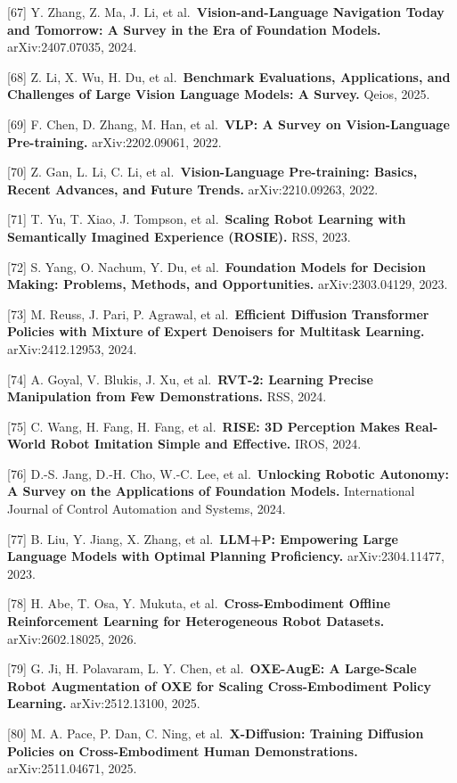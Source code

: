 {[}67{]} Y. Zhang, Z. Ma, J. Li, et al.~\textbf{Vision-and-Language Navigation Today and Tomorrow: A Survey in the Era of Foundation Models.} arXiv:2407.07035, 2024.

{[}68{]} Z. Li, X. Wu, H. Du, et al.~\textbf{Benchmark Evaluations, Applications, and Challenges of Large Vision Language Models: A Survey.} Qeios, 2025.

{[}69{]} F. Chen, D. Zhang, M. Han, et al.~\textbf{VLP: A Survey on Vision-Language Pre-training.} arXiv:2202.09061, 2022.

{[}70{]} Z. Gan, L. Li, C. Li, et al.~\textbf{Vision-Language Pre-training: Basics, Recent Advances, and Future Trends.} arXiv:2210.09263, 2022.

{[}71{]} T. Yu, T. Xiao, J. Tompson, et al.~\textbf{Scaling Robot Learning with Semantically Imagined Experience (ROSIE).} RSS, 2023.

{[}72{]} S. Yang, O. Nachum, Y. Du, et al.~\textbf{Foundation Models for Decision Making: Problems, Methods, and Opportunities.} arXiv:2303.04129, 2023.

{[}73{]} M. Reuss, J. Pari, P. Agrawal, et al.~\textbf{Efficient Diffusion Transformer Policies with Mixture of Expert Denoisers for Multitask Learning.} arXiv:2412.12953, 2024.

{[}74{]} A. Goyal, V. Blukis, J. Xu, et al.~\textbf{RVT-2: Learning Precise Manipulation from Few Demonstrations.} RSS, 2024.

{[}75{]} C. Wang, H. Fang, H. Fang, et al.~\textbf{RISE: 3D Perception Makes Real-World Robot Imitation Simple and Effective.} IROS, 2024.

{[}76{]} D.-S. Jang, D.-H. Cho, W.-C. Lee, et al.~\textbf{Unlocking Robotic Autonomy: A Survey on the Applications of Foundation Models.} International Journal of Control Automation and Systems, 2024.

{[}77{]} B. Liu, Y. Jiang, X. Zhang, et al.~\textbf{LLM+P: Empowering Large Language Models with Optimal Planning Proficiency.} arXiv:2304.11477, 2023.

{[}78{]} H. Abe, T. Osa, Y. Mukuta, et al.~\textbf{Cross-Embodiment Offline Reinforcement Learning for Heterogeneous Robot Datasets.} arXiv:2602.18025, 2026.

{[}79{]} G. Ji, H. Polavaram, L. Y. Chen, et al.~\textbf{OXE-AugE: A Large-Scale Robot Augmentation of OXE for Scaling Cross-Embodiment Policy Learning.} arXiv:2512.13100, 2025.

{[}80{]} M. A. Pace, P. Dan, C. Ning, et al.~\textbf{X-Diffusion: Training Diffusion Policies on Cross-Embodiment Human Demonstrations.} arXiv:2511.04671, 2025.

